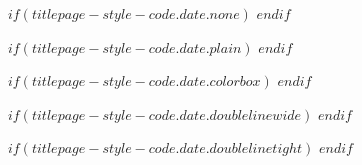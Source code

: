 $if(titlepage-style-code.date.none)$
\newcommand{\titlepagedateblock}{}
$endif$

$if(titlepage-style-code.date.plain)$
\newcommand{\titlepagedateblock}{
\datestyled
}
$endif$

$if(titlepage-style-code.date.colorbox)$
\newcommand{\titlepagedateblock}{
{\setlength{\fboxrule}{$if(titlepage-theme.date-colorbox-borderwidth)$$titlepage-theme.date-colorbox-borderwidth$$else$0pt$endif$}
\fcolorbox{$if(titlepage-theme.date-colorbox-bordercolor)$$titlepage-theme.date-colorbox-bordercolor$$else$black$endif$}{$if(titlepage-theme.date-colorbox-fill)$$titlepage-theme.date-colorbox-fill$$else$cyan$endif$}{
\parbox[t]{0.90\minipagewidth}{ %
\parbox[t]{0.85\minipagewidth}{ %
$if(titlepage-theme.date-align)$\titlepagedatealign$else$$if(titlepage-theme.page-align)$\titlepagepagealign$endif$$endif$
\vspace{0.7cm}

\datestyled

\vspace{0.7cm}
}} %
} %
} %
}
$endif$

$if(titlepage-style-code.date.doublelinewide)$
\newcommand{\titlepagedateblock}{
\rule{\textwidth}{0.4pt} %
\vspace{0.1\textheight} %

\datestyled

\vspace{0.025\textheight} 
\rule{0.3\textwidth}{0.4pt} %
}
$endif$

$if(titlepage-style-code.date.doublelinetight)$
\newcommand{\titlepagedateblock}{
\newcommand{\HRule}{\rule{\linewidth}{0.5mm}} 

\HRule\\[0.4cm]

\datestyled

\HRule\\
}
$endif$


